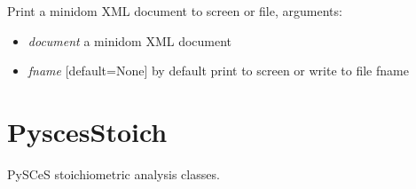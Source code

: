 \documentclass[a4paper,11pt,english]{sphinxmanual}
\begin{document}

\begin{fulllineitems}
\label{modules_doc:cbmpy.CBXML.xml_viewSBML2FBAXML}
Print a minidom XML document to screen or file, arguments:
\begin{itemize}
\item {} 
\emph{document} a minidom XML document

\item {} 
\emph{fname} {[}default=None{]} by default print to screen or write to file fname

\end{itemize}

\end{fulllineitems}

\label{modules_doc:module-cbmpy.PyscesStoich}

\section{PyscesStoich}
\label{modules_doc:pyscesstoich}
PySCeS stoichiometric analysis classes.
\end{document}
